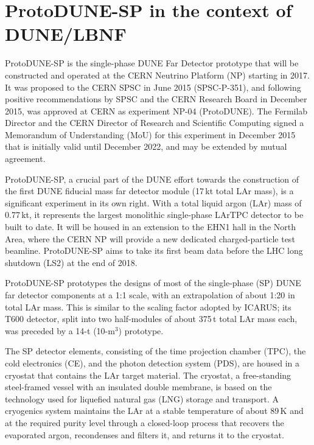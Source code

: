 
\section{ProtoDUNE-SP in the context of DUNE/LBNF}

ProtoDUNE-SP is the single-phase DUNE Far Detector prototype that will be constructed and operated at the CERN Neutrino Platform (NP) starting in 2017. It was proposed to the CERN SPSC in June 2015 (SPSC-P-351), and following positive recommendations by SPSC and the CERN Research Board in December 2015, was approved at CERN as experiment NP-04 (ProtoDUNE). The Fermilab Director and the CERN Director of Research and Scientific Computing signed a Memorandum of Understanding (MoU) for this experiment in December 2015 that is initially valid until December 2022, 
and may be extended by mutual agreement. 

ProtoDUNE-SP, a crucial part of the DUNE effort towards the construction of the first DUNE  fiducial mass far detector module (17\,kt total LAr mass), is a significant experiment in its own right. With a total liquid argon (LAr) mass of 0.77\,kt, it represents the largest monolithic single-phase LArTPC detector to be built to date.  
It will be housed in an extension to the EHN1 hall in the North Area, where the CERN NP will provide a new dedicated charged-particle test beamline. ProtoDUNE-SP aims to take its first beam data before the LHC long shutdown (LS2) at the end of 2018.

ProtoDUNE-SP prototypes the designs of most of the single-phase (SP) DUNE far detector components at a 1:1 scale, with an extrapolation of about 1:20 in total LAr mass. This is similar to the scaling factor adopted 
by ICARUS; its T600 detector, split into two half-modules of about 375\,t total LAr mass each, was preceded by a 14-t (10-m$^3$) prototype. 

The SP detector elements, consisting of the time projection chamber (TPC), the cold electronics (CE), and the photon detection system (PDS), are housed in a cryostat that contains the LAr target material. The cryostat, a free-standing steel-framed vessel with an insulated double membrane, is based on the technology used for liquefied natural gas (LNG) storage and transport. 
A cryogenics system maintains the LAr at a stable temperature of about 89\,K and at the required purity level  through a closed-loop process that recovers the evaporated argon, recondenses and filters it, and returns it to the cryostat. 

